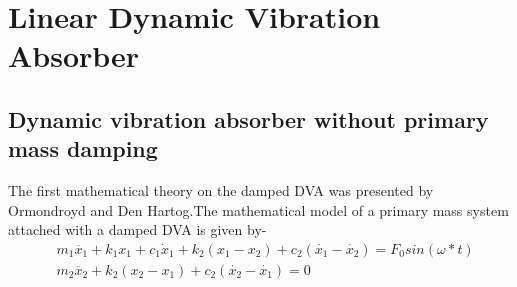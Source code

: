 \chapter{Linear Dynamic Vibration Absorber}
\section{Dynamic vibration absorber without primary mass damping}
The first mathematical theory on the damped DVA was presented by Ormondroyd and Den Hartog.The mathematical model of a primary mass system attached with a damped DVA is given by-\begin{align}
&m_1\ddot{x_1}+k_1x_1+c_1 \dot x_1 + k_2(x_1-x_2)+c_2(\dot{x_1}-\dot{x_2})=F_0sin(\omega *t) \\
&m_2\ddot{x_2}+k_2(x_2-x_1)+c_{2}(\dot{x_{2}}-\dot{x_{1}})=0
\end{align}

